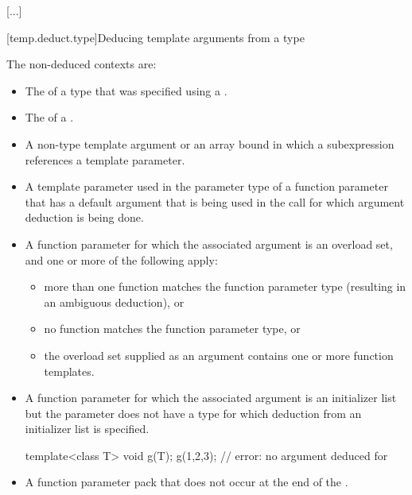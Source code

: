 \documentclass{wg21}
\begin{document}
\textcolor{noteclr}{[...]}

[temp.deduct.type]{Deducing template arguments from a type}


\pnum
The non-deduced contexts are:

%
\begin{itemize}
    \item
    The
    of a type that was specified using a
    .
    \item
    The  of a .
    \item
    A non-type template argument or an array bound in which a subexpression
    references a template parameter.
    \item
    A template parameter used in the parameter type of a function parameter that
    has a default argument that is being used in the call for which argument
    deduction is being done.
    \item
    A function parameter for which the associated argument is an
    overload set, and one or more of the following apply:
    \begin{itemize}
        \item
        more than one function matches the function parameter type (resulting in
        an ambiguous deduction), or
        \item
        no function matches the function parameter type, or
        \item
        the overload set supplied as an argument contains one or more function templates.
    \end{itemize}
    \item A function parameter for which the associated argument is an initializer
    list but the parameter does not have
    a type for which deduction from an initializer list is specified.
    \begin{example}
        \begin{codeblock}
            template<class T> void g(T);
            g({1,2,3});                 // error: no argument deduced for 
        \end{codeblock}
    \end{example}
    \item A function parameter pack that does not occur at the end of the
    .
\end{itemize}
\end{document}
